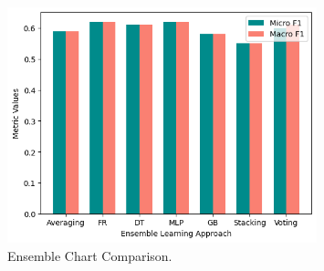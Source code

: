 \documentclass[12pt]{article}
\begin{document}
\begin{figure}[h!]
  \centering
  \includegraphics[width=0.8\textwidth, height=0.4\textheight]{./ensemble_chart.jpg}
  \caption{Ensemble Chart Comparison.}
  \label{fig:Ensemble_chart_confusion}
\end{figure}
\end{document}
